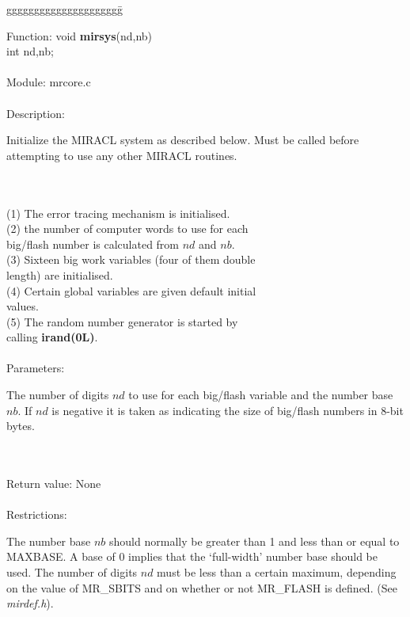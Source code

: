 \begin{tabbing}
ggggggggggggggggggggg\= \kill


      Function:      \>void {\bf mirsys}(nd,nb) \\
                     \>int nd,nb; \\
      \ \\
      Module:        \>mrcore.c \\
      \ \\
      Description:   \>
                     \parbox[t]{3in}
                     {Initialize the MIRACL system as described below. Must 
                     be called before attempting to use any other MIRACL 
                     routines.} \\  
      \ \\
                     \>(1) The error tracing mechanism is initialised. \\
                     \>(2) the number of computer words to use for each  \\
                     \>    big/flash number is calculated from $nd$ and $nb$. \\  
                     \>(3) Sixteen big work variables (four of them double \\
                     \>    length) are initialised. \\  
                     \>(4) Certain global variables are given default initial\\
                     \>    values. \\
                     \>(5) The random number generator is started by \\
                     \>    calling {\bf irand(0L)}. \\
      \ \\
      Parameters:    \>
                     \parbox[t]{3in}
                     {The number of digits $nd$ to use for each big/flash 
                     variable and the number base $nb$. If $nd$ is negative it 
                     is taken as indicating the size of big/flash numbers 
                     in 8-bit bytes.} \\  
      \ \\
      Return value:  \>None \\
      \ \\
      Restrictions:  \>
                     \parbox[t]{3in}
                     {The number base $nb$ should normally be greater than 1 
                     and less than or equal to MAXBASE. A base of 0 implies
                     that the `full-width' number base should be used.
                     The number of digits $nd$ must be less than a certain 
                     maximum, depending on the value of MR\_SBITS and on
                     whether or not MR\_FLASH is defined. 
                     (See {\em mirdef.h}).} \\  
      \ \\


\end{tabbing}
